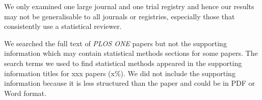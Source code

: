 \documentclass[12pt]{article}
\begin{document}
We only examined one large journal and one trial registry and hence our
results may not be generalisable to all journals or registries,
especially those that consistently use a statistical reviewer.

We searched the full text of \emph{PLOS ONE} papers but not the
supporting information which may contain statistical methods sections
for some papers. The search terms we used to find statistical methods
appeared in the supporting information titles for xxx papers (x\%). We
did not include the supporting information because it is less structured
than the paper and could be in PDF or Word format.



\end{document}
